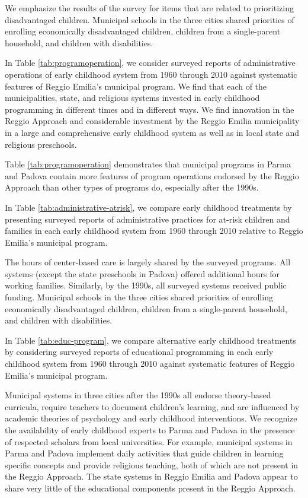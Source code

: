 We emphasize the results of the survey for items that are related to prioritizing disadvantaged children. Municipal schools in the three cities shared priorities of enrolling economically disadvantaged children, children from a single-parent household, and children with disabilities.


In Table \ref{tab:programoperation}, we consider surveyed reports of administrative operations of early childhood system from 1960 through 2010 against systematic features of Reggio Emilia's municipal program. We find that each of the municipalities, state, and religious systems invested in early childhood programming in different times and in different ways. We find innovation in the Reggio Approach and considerable investment by the Reggio Emilia municipality in a large and comprehensive early childhood system as well as in local state and religious preschools. 

Table \ref{tab:programoperation} demonstrates that municipal programs in Parma and Padova contain more features of program operations endorsed by the Reggio Approach than other types of programs do, especially after the 1990s.

In Table \ref{tab:administrative-atrisk}, we compare early childhood treatments by presenting surveyed reports of administrative practices for at-risk children and families in each early childhood system from 1960 through 2010 relative to Reggio Emilia's municipal program.

The hours of center-based care is largely shared by the surveyed programs. All systems (except the state preschools in Padova) offered additional hours for working families. Similarly, by the 1990s, all surveyed systems received public funding. Municipal schools in the three cities shared priorities of enrolling economically disadvantaged children, children from a single-parent household, and children with disabilities.							

In Table \ref{tab:educ-program}, we compare alternative early childhood treatments by considering surveyed reports of educational programming in each early childhood system from 1960 through 2010 against systematic features of Reggio Emilia's municipal program.  

Municipal systems in three cities after the 1990s all endorse theory-based curricula, require teachers to document children's learning, and are influenced by academic theories of psychology and early childhood interventions. We recognize the availability of early childhood experts to Parma and Padova in the presence of respected scholars from local universities. For example, municipal systems in Parma and Padova implement daily activities that guide children in learning specific concepts and provide religious teaching, both of which are not present in the Reggio Approach. The state systems in Reggio Emilia and Padova appear to share very little of the educational components present in the Reggio Approach.												

